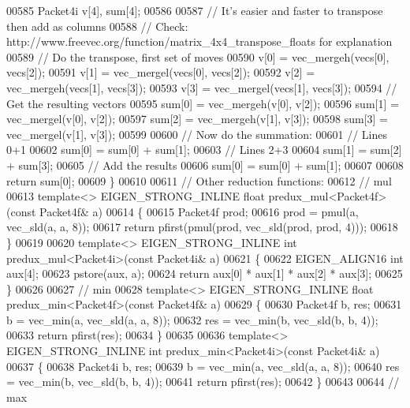 \begin{DoxyCode}
{00585   Packet4i v[4], sum[4];
00586 
00587   \textcolor{comment}{// It's easier and faster to transpose then add as columns}
00588   \textcolor{comment}{// Check: http://www.freevec.org/function/matrix\_4x4\_transpose\_floats for explanation}
00589   \textcolor{comment}{// Do the transpose, first set of moves}
00590   v[0] = vec\_mergeh(vecs[0], vecs[2]);
00591   v[1] = vec\_mergel(vecs[0], vecs[2]);
00592   v[2] = vec\_mergeh(vecs[1], vecs[3]);
00593   v[3] = vec\_mergel(vecs[1], vecs[3]);
00594   \textcolor{comment}{// Get the resulting vectors}
00595   sum[0] = vec\_mergeh(v[0], v[2]);
00596   sum[1] = vec\_mergel(v[0], v[2]);
00597   sum[2] = vec\_mergeh(v[1], v[3]);
00598   sum[3] = vec\_mergel(v[1], v[3]);
00599 
00600   \textcolor{comment}{// Now do the summation:}
00601   \textcolor{comment}{// Lines 0+1}
00602   sum[0] = sum[0] + sum[1];
00603   \textcolor{comment}{// Lines 2+3}
00604   sum[1] = sum[2] + sum[3];
00605   \textcolor{comment}{// Add the results}
00606   sum[0] = sum[0] + sum[1];
00607 
00608   \textcolor{keywordflow}{return} sum[0];
00609 \}
00610 
00611 \textcolor{comment}{// Other reduction functions:}
00612 \textcolor{comment}{// mul}
00613 \textcolor{keyword}{template}<> EIGEN\_STRONG\_INLINE \textcolor{keywordtype}{float} predux\_mul<Packet4f>(\textcolor{keyword}{const} Packet4f& a)
00614 \{
00615   Packet4f prod;
00616   prod = pmul(a, vec\_sld(a, a, 8));
00617   \textcolor{keywordflow}{return} pfirst(pmul(prod, vec\_sld(prod, prod, 4)));
00618 \}
00619 
00620 \textcolor{keyword}{template}<> EIGEN\_STRONG\_INLINE \textcolor{keywordtype}{int} predux\_mul<Packet4i>(\textcolor{keyword}{const} Packet4i& a)
00621 \{
00622   EIGEN\_ALIGN16 \textcolor{keywordtype}{int} aux[4];
00623   pstore(aux, a);
00624   \textcolor{keywordflow}{return} aux[0] * aux[1] * aux[2] * aux[3];
00625 \}
00626 
00627 \textcolor{comment}{// min}
00628 \textcolor{keyword}{template}<> EIGEN\_STRONG\_INLINE \textcolor{keywordtype}{float} predux\_min<Packet4f>(\textcolor{keyword}{const} Packet4f& a)
00629 \{
00630   Packet4f b, res;
00631   b = vec\_min(a, vec\_sld(a, a, 8));
00632   res = vec\_min(b, vec\_sld(b, b, 4));
00633   \textcolor{keywordflow}{return} pfirst(res);
00634 \}
00635 
00636 \textcolor{keyword}{template}<> EIGEN\_STRONG\_INLINE \textcolor{keywordtype}{int} predux\_min<Packet4i>(\textcolor{keyword}{const} Packet4i& a)
00637 \{
00638   Packet4i b, res;
00639   b = vec\_min(a, vec\_sld(a, a, 8));
00640   res = vec\_min(b, vec\_sld(b, b, 4));
00641   \textcolor{keywordflow}{return} pfirst(res);
00642 \}
00643 
00644 \textcolor{comment}{// max}
}
\end{DoxyCode}
